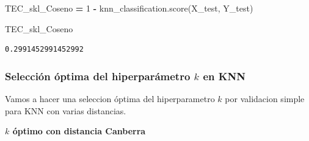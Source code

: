 \documentclass[
  11pt,
  a4paper,
]{article}
\newenvironment{Shaded}{\begin{snugshade}}{\end{snugshade}}
\newcommand{\DecValTok}[1]{\textcolor[rgb]{0.00,0.00,0.81}{#1}}
\newcommand{\NormalTok}[1]{#1}
\newcommand{\OperatorTok}[1]{\textcolor[rgb]{0.81,0.36,0.00}{\textbf{#1}}}
\begin{document}
\begin{Shaded}
\begin{Highlighting}[]
\NormalTok{TEC\_skl\_Coseno }\OperatorTok{=} \DecValTok{1} \OperatorTok{{-}}\NormalTok{ knn\_classification.score(X\_test, Y\_test)}

\NormalTok{TEC\_skl\_Coseno}
\end{Highlighting}
\end{Shaded}

\begin{verbatim}
0.2991452991452992
\end{verbatim}

\newpage

\hypertarget{selecciuxf3n-uxf3ptima-del-hiperparuxe1metro-k-en-knn}{%
\subsubsection{\texorpdfstring{Selección óptima del hiperparámetro \(k\)
en
KNN}{Selección óptima del hiperparámetro k en KNN}}\label{selecciuxf3n-uxf3ptima-del-hiperparuxe1metro-k-en-knn}}

Vamos a hacer una seleccion óptima del hiperparametro \(k\) por
validacion simple para KNN con varias distancias.

\vspace{0.35cm}

\textbf{\(k\) óptimo con distancia Canberra}
\end{document}
